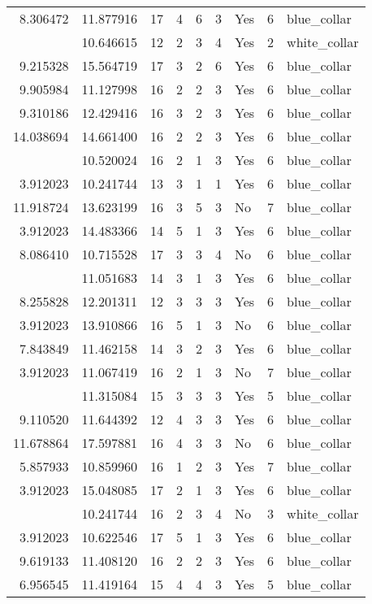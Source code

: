 \documentclass[
]{article}
\begin{document}
\begin{longtable}[t]{rrrrrllrl}
8.306472 & 11.877916 & 17 & 4 & 6 & 3 & Yes & 6 & blue\_collar\\
\addlinespace
5.521461 & 10.646615 & 12 & 2 & 3 & 4 & Yes & 2 & white\_collar\\
9.215328 & 15.564719 & 17 & 3 & 2 & 6 & Yes & 6 & blue\_collar\\
9.905984 & 11.127998 & 16 & 2 & 2 & 3 & Yes & 6 & blue\_collar\\
9.310186 & 12.429416 & 16 & 3 & 2 & 3 & Yes & 6 & blue\_collar\\
14.038694 & 14.661400 & 16 & 2 & 2 & 3 & Yes & 6 & blue\_collar\\
\addlinespace
3.912023 & 10.520024 & 16 & 2 & 1 & 3 & Yes & 6 & blue\_collar\\
3.912023 & 10.241744 & 13 & 3 & 1 & 1 & Yes & 6 & blue\_collar\\
11.918724 & 13.623199 & 16 & 3 & 5 & 3 & No & 7 & blue\_collar\\
3.912023 & 14.483366 & 14 & 5 & 1 & 3 & Yes & 6 & blue\_collar\\
8.086410 & 10.715528 & 17 & 3 & 3 & 4 & No & 6 & blue\_collar\\
\addlinespace
3.912023 & 11.051683 & 14 & 3 & 1 & 3 & Yes & 6 & blue\_collar\\
8.255828 & 12.201311 & 12 & 3 & 3 & 3 & Yes & 6 & blue\_collar\\
3.912023 & 13.910866 & 16 & 5 & 1 & 3 & No & 6 & blue\_collar\\
7.843849 & 11.462158 & 14 & 3 & 2 & 3 & Yes & 6 & blue\_collar\\
3.912023 & 11.067419 & 16 & 2 & 1 & 3 & No & 7 & blue\_collar\\
\addlinespace
8.306472 & 11.315084 & 15 & 3 & 3 & 3 & Yes & 5 & blue\_collar\\
9.110520 & 11.644392 & 12 & 4 & 3 & 3 & Yes & 6 & blue\_collar\\
11.678864 & 17.597881 & 16 & 4 & 3 & 3 & No & 6 & blue\_collar\\
5.857933 & 10.859960 & 16 & 1 & 2 & 3 & Yes & 7 & blue\_collar\\
3.912023 & 15.048085 & 17 & 2 & 1 & 3 & Yes & 6 & blue\_collar\\
\addlinespace
8.306472 & 10.241744 & 16 & 2 & 3 & 4 & No & 3 & white\_collar\\
3.912023 & 10.622546 & 17 & 5 & 1 & 3 & Yes & 6 & blue\_collar\\
9.619133 & 11.408120 & 16 & 2 & 2 & 3 & Yes & 6 & blue\_collar\\
6.956545 & 11.419164 & 15 & 4 & 4 & 3 & Yes & 5 & blue\_collar\\

\end{longtable}
\end{document}
